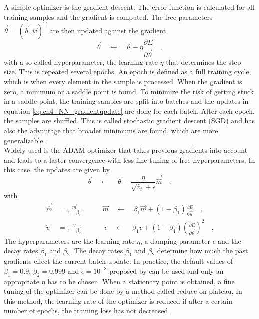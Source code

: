 A simple optimizer is the gradient descent. The error function is calculated for all training samples and the gradient is computed. The free parameters $\vec{\theta} = (\vec{b},\vec{w})^\textrm{T}$ are then updated against the gradient
\begin{equation} \label{eq:ch4_NN_gradientupdate}
\vec{\theta} \quad \leftarrow\quad \vec{\theta} - \eta \frac{\partial E}{\partial \vec{\theta}} \quad ,
\end{equation}
with a so called hyperparameter, the learning rate $\eta$ that determines the step size. This is repeated several epochs. An epoch is defined as a full training cycle, which is when every element in the sample is processed. When the gradient is zero, a minimum or a saddle point is found. To minimize the risk of getting stuck in a saddle point, the training samples are split into batches and the updates in equation \ref{eq:ch4_NN_gradientupdate} are done for each batch. After each epoch, the samples are shuffled. This is called stochastic gradient descent (SGD) and has also the advantage that broader minimums are found, which are more generalizable.\\

Widely used is the ADAM optimizer \cite{ADAM} that takes previous gradients into account and leads to a faster convergence with less fine tuning of free hyperparameters. In this case, the updates are given by
\begin{equation}
\vec{\theta} \quad \leftarrow\quad \vec{\theta} - \frac{\eta}{\sqrt{\hat{v}_t} + \epsilon} \vec{\hat{m}} \quad ,
\end{equation}
with
\begin{equation}
\begin{split}
\vec{\hat{m}} &= \frac{\vec{m}}{1-\beta_1} \qquad \quad \vec{m} \quad \leftarrow\quad \beta_1 \vec{m} + (1-\beta_1)\frac{\partial E}{\partial \vec{\theta}} \quad ,\\
\hat{v} &= \frac{v}{1-\beta_2} \qquad \quad \ v \quad \leftarrow\quad \beta_1 v + (1-\beta_1)\left(\frac{\partial E}{\partial \vec{\theta}}\right)^2 \quad .
\end{split}
\end{equation}
The hyperparameters are the learning rate $\eta$, a damping parameter $\epsilon$ and the decay rates $\beta_1$ and $\beta_2$. The decay rates $\beta_1$ and $\beta_2$ determine how much the past gradients effect the current batch update. In practice, the default values of $\beta_1 = 0.9$, $\beta_2 = 0.999$ and $\epsilon = 10^{-8}$ proposed by \cite{ADAM} can be used and only an appropriate $\eta$ has to be chosen. When a stationary point is obtained, a fine tuning of the optimizer can be done by a method called reduce-on-plateau. In this method, the learning rate of the optimizer is reduced if after a certain number of epochs, the training loss has not decreased. \\

